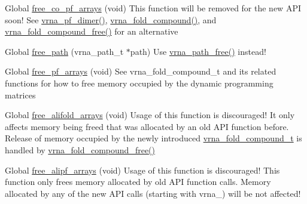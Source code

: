 \begin{DoxyRefList}
\item[Global \mbox{\hyperlink{group__part__func__global__deprecated_gade3ce34ae8214811374b1d28a40dc247}{free\+\_\+co\+\_\+pf\+\_\+arrays}} (void)]\label{deprecated__deprecated000118}%
%
This function will be removed for the new API soon! See \mbox{\hyperlink{group__part__func__global_ga4e5c7d06c302a7c59fc0d64dc142ca63}{vrna\+\_\+pf\+\_\+dimer()}}, \mbox{\hyperlink{group__fold__compound_ga283cf113a37614a75c1388c4ec6d7b2f}{vrna\+\_\+fold\+\_\+compound()}}, and \mbox{\hyperlink{group__fold__compound_ga576a077b418a9c3650e06f8e5d296fc2}{vrna\+\_\+fold\+\_\+compound\+\_\+free()}} for an alternative


\item[Global \mbox{\hyperlink{group__paths__deprecated_ga9056421d716ae89f0ed3f107627f395b}{free\+\_\+path}} (vrna\+\_\+path\+\_\+t $\ast$path)]\label{deprecated__deprecated000168}%
%
Use \mbox{\hyperlink{group__paths_ga3763dc16760d09277a1b1c3f3061d0c7}{vrna\+\_\+path\+\_\+free()}} instead! 
\item[Global \mbox{\hyperlink{group__part__func__global__deprecated_gae73db3f49a94f0f72e067ecd12681dbd}{free\+\_\+pf\+\_\+arrays}} (void)]\label{deprecated__deprecated000100}%
%
See vrna\+\_\+fold\+\_\+compound\+\_\+t and its related functions for how to free memory occupied by the dynamic programming matrices 
\item[Global \mbox{\hyperlink{group__mfe__global__deprecated_ga72095e4554b5d577250ea14c42acc49e}{free\+\_\+alifold\+\_\+arrays}} (void)]\label{deprecated__deprecated000014}%
%
Usage of this function is discouraged! It only affects memory being free\textquotesingle{}d that was allocated by an old API function before. Release of memory occupied by the newly introduced \mbox{\hyperlink{group__fold__compound_ga1b0cef17fd40466cef5968eaeeff6166}{vrna\+\_\+fold\+\_\+compound\+\_\+t}} is handled by \mbox{\hyperlink{group__fold__compound_ga576a077b418a9c3650e06f8e5d296fc2}{vrna\+\_\+fold\+\_\+compound\+\_\+free()}} 
\item[Global \mbox{\hyperlink{group__part__func__global__deprecated_ga0c0498f35686e26b38ee460d3db1a661}{free\+\_\+alipf\+\_\+arrays}} (void)]\label{deprecated__deprecated000022}%
%
Usage of this function is discouraged! This function only free\textquotesingle{}s memory allocated by old API function calls. Memory allocated by any of the new API calls (starting with vrna\+\_\+) will be not affected! 

\end{DoxyRefList}
